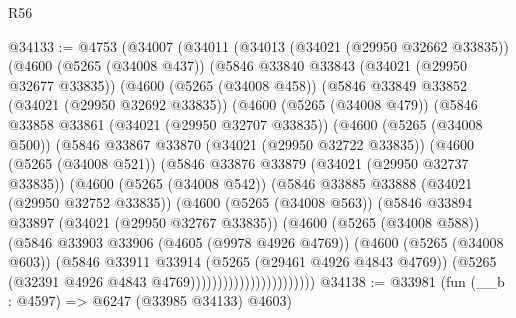 \begin{lexlean}{R56}
\begin{coremodule}
@34133 := @4753
    (@34007
      (@34011
        (@34013
          (@34021 (@29950 @32662 @33835))
          (@4600
            (@5265 (@34008 @437))
            (@5846
              @33840
              @33843
              (@34021 (@29950 @32677 @33835))
              (@4600
                (@5265 (@34008 @458))
                (@5846
                  @33849
                  @33852
                  (@34021 (@29950 @32692 @33835))
                  (@4600
                    (@5265 (@34008 @479))
                    (@5846
                      @33858
                      @33861
                      (@34021 (@29950 @32707 @33835))
                      (@4600
                        (@5265 (@34008 @500))
                        (@5846
                          @33867
                          @33870
                          (@34021 (@29950 @32722 @33835))
                          (@4600
                            (@5265 (@34008 @521))
                            (@5846
                              @33876
                              @33879
                              (@34021 (@29950 @32737 @33835))
                              (@4600
                                (@5265 (@34008 @542))
                                (@5846
                                  @33885
                                  @33888
                                  (@34021 (@29950 @32752 @33835))
                                  (@4600
                                    (@5265 (@34008 @563))
                                    (@5846
                                      @33894
                                      @33897
                                      (@34021 (@29950 @32767 @33835))
                                      (@4600
                                        (@5265 (@34008 @588))
                                        (@5846
                                          @33903
                                          @33906
                                          (@4605 (@9978 @4926 @4769))
                                          (@4600
                                            (@5265 (@34008 @603))
                                            (@5846
                                              @33911
                                              @33914
                                              (@5265 (@29461 @4926 @4843 @4769))
                                              (@5265
                                                (@32391 @4926 @4843 @4769)))))))))))))))))))))))
@34138 := @33981 (fun (__b : @4597) => @6247 (@33985 @34133) @4603)

\end{coremodule}
\end{lexlean}
